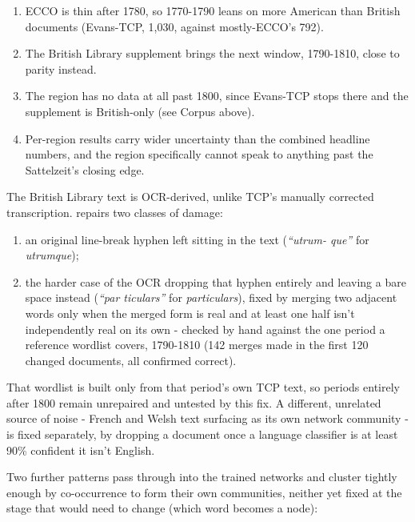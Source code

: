 \documentclass[11pt]{article}
\begin{document}
\begin{enumerate}[itemsep=0.15em,label=\arabic*.]
  \item ECCO is thin after 1780, so 1770-1790 leans on more American
    than British documents (Evans-TCP, 1{,}030, against mostly-ECCO's
    792).
  \item The British Library supplement brings the next window,
    1790-1810, close to parity instead.
  \item The  region has no data at all past 1800, since
    Evans-TCP stops there and the supplement is British-only (see
    Corpus above).
  \item Per-region results carry wider uncertainty than the combined
    headline numbers, and the  region specifically
    cannot speak to anything past the Sattelzeit's closing edge.
\end{enumerate}

 The British Library text is OCR-derived,
unlike TCP's manually corrected transcription. 
repairs two classes of damage:

\begin{enumerate}[itemsep=0.15em,label=\arabic*.]
  \item an original line-break hyphen left sitting in the text
    (\emph{``utrum- que''} for \emph{utrumque});
  \item the harder case of the OCR dropping that hyphen entirely and
    leaving a bare space instead (\emph{``par ticulars''} for
    \emph{particulars}), fixed by merging two adjacent words only when
    the merged form is real and at least one half isn't independently
    real on its own - checked by hand against the one period a
    reference wordlist covers, 1790-1810 (142 merges made in the first
    120 changed documents, all confirmed correct).
\end{enumerate}

That wordlist is
built only from that period's own TCP text, so periods entirely after
1800 remain unrepaired and untested by this fix. A different, unrelated
source of noise - French and Welsh text surfacing as its own network
community - is fixed separately, by dropping a document once a language
classifier is at least 90\% confident it isn't English.

 Two further patterns pass
through into the trained networks and cluster tightly enough by
co-occurrence to form their own communities, neither yet fixed at the
stage that would need to change (which word becomes a node):
\end{document}

